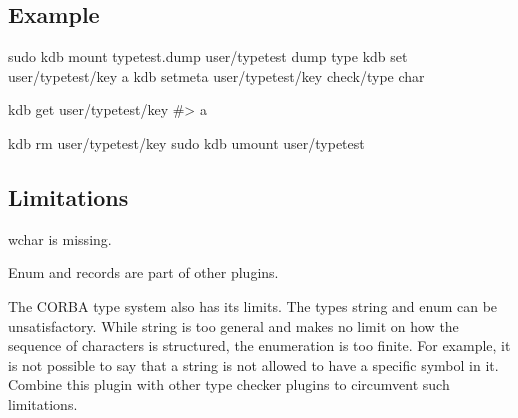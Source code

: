 \subsection*{Example}


\begin{DoxyCode}
sudo kdb mount typetest.dump user/typetest dump type
kdb set user/typetest/key a
kdb setmeta user/typetest/key check/type char

kdb get user/typetest/key
#> a

kdb rm user/typetest/key
sudo kdb umount user/typetest
\end{DoxyCode}


\subsection*{Limitations}

{\ttfamily wchar} is missing.

Enum and records are part of other plugins.

The {\ttfamily C\+O\+R\+BA} type system also has its limits. The types {\ttfamily string} and {\ttfamily enum} can be unsatisfactory. While string is too general and makes no limit on how the sequence of characters is structured, the enumeration is too finite. For example, it is not possible to say that a string is not allowed to have a specific symbol in it. Combine this plugin with other type checker plugins to circumvent such limitations. 